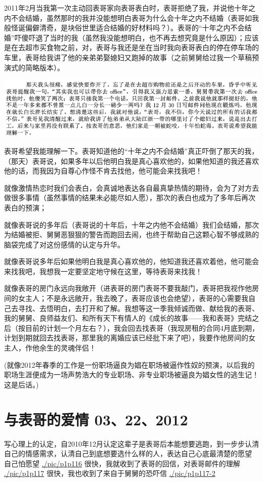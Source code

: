 \documentclass[9pt, b5paper]{article}
\begin{document}
2011年2月当我第一次主动回表哥家向表哥表白时，表哥拒绝了我，并说他十年之内不会结婚，虽然那时的我并没能想明白表哥为什么会十年之内不结婚（表哥如我般怪诞偏僻清奇，是块俗世里适合结婚的好材料吗？）。表哥的“十年之内不会结婚”吓傻吓退了当时的我（虽然我没能想明白，也不再去想究竟是什么原因）；应该是在去超市买食物之前，对，表哥与我还是坐在当时我向表哥表白的停在停车场的车里，表哥给我讲了他的亲弟弟娶媳妇又跑掉的故事（之前舅舅给过我一个草稿预演式的简略版本）。

\begin{center}
\includegraphics[width=.9\linewidth]{./pic/p1p50-4.png}
\end{center}

表哥希望我能理解一下。表哥知道他的“十年之内不会结婚”真正吓倒了那天的我，（那天）表哥说，如果多年以后他明白我是真心喜欢他的，如果他知道的我还喜欢他的话，而我因为自尊心作怪不肯去找他，他可能会来找我吧！

就像激情热恋时我们会表白，会真诚地表达各自最真挚热情的期待，会为了对方去做很多事情（虽然事情的结果未必能尽如人愿），那次的表白也成为了多年后再次表白的预演；

就像表哥说的多年后（表哥说的十年后，十年之内他不会结婚）我们会结婚，那次为结婚被拒、舅舅恶狠狠的警告而跑回去闹，也终于帮助自己这颗心智不够成熟的脑袋完成了对这份感情的认定与升华。

就像表哥说多年后如果他明白我是真心喜欢他的，他知道我还喜欢着他，他可能会来找我吧，我想我一定要坚定地守候在这里，等待表哥来找我！

就像表哥的房门永远向我敞开（进表哥的房门表哥不要我敲门，表哥把我视作他房间的女主人；不是永远敞开，我去晚了，表哥应该也会绝望），表哥的心需要我自己去寻找、去悟明白，去打开和了解。我想等这一季我倾诚而做、献给我的表哥、我的舅舅、良师益友们、和所有天下有情人的《成长的故事——我和表哥》完结之后（按目前的计划一个月左右？），我会回去找表哥（我现房租的合同4月底到期，计划到期就回去找表哥，那里我的离婚应该已经批下来了吧），我要作他房间的女主人，作他余生的灵魂伴侣！

(就像2012年春季的工作是一份职场逼良为娼在职场被逼作性奴的预演，以后我的职场生涯便成为一场声势浩大的专业职场、非专业职场被逼良为娼女性的逃生记！这是后话。)

\section{与表哥的爱情 03、22、2012}
\label{sec:orgee63465}
写心理上的认定，自2010年12月认定这辈子是表哥后本能想要逃跑，到一步步认清自己的情感需求，认清自己到底想要选什么样的人，表达自己心底最清楚的愿望
自己怕愿望
\url{./pic/p1p116}
很快，我就收到了表哥的回信，对表哥邮件的理解
\url{./pic/p1p117}
很快，我也收到了来自于舅舅的恐吓信
\url{./pic/p1p117-2}
\end{document}
